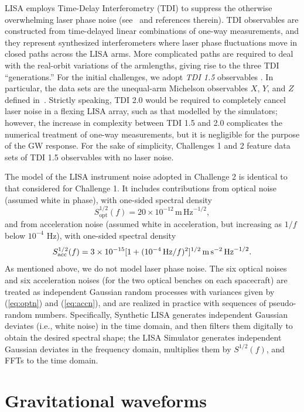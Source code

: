 \documentclass{iopart}
\def\be{\begin{equation}}
\def\ee{\end{equation}}
\begin{document}
LISA employs Time-Delay Interferometry (TDI) to suppress the otherwise overwhelming laser phase noise (see~\cite{firstgen,modified,secondgen} and references therein). TDI observables are constructed from time-delayed linear combinations of one-way measurements, and they represent synthesized interferometers where laser phase fluctuations move in closed paths across the LISA arms. More complicated paths are required to deal with the real-orbit variations of the armlengths, giving rise to the three TDI ``generations.'' For the initial challenges, we adopt \emph{TDI 1.5} observables \cite{modified,secondgen}. In particular, the data sets are the unequal-arm Michelson observables $X$, $Y$, and $Z$ defined in~\cite{secondgen}. Strictly speaking, TDI 2.0 would be required to completely cancel laser noise in a flexing LISA array, such as that modelled by the simulators; however, the increase in complexity between TDI 1.5 and 2.0 complicates the numerical treatment of one-way measurements, but it is negligible for the purpose of the GW response. For the sake of simplicity, Challenges 1 and 2 feature data sets of TDI 1.5 observables with no laser noise.

The model of the LISA instrument noise adopted in Challenge 2 is identical to that considered for Challenge 1. It includes contributions from optical noise (assumed white in phase), with one-sided spectral density
\be
S_\mathrm{opt}^{1/2}(f) = 20 \times 10^{-12} \, \mathrm{m}\, \mathrm{Hz}^{-1/2},
\label{eq:optn}
\ee
and from acceleration noise (assumed white in acceleration, but increasing as $1/f$ below $10^{-4}$ Hz), with one-sided spectral density 
\be
S_\mathrm{acc}^{1/2}(f) = 3 \times 10^{-15} [1 + (10^{-4}\,{\rm Hz}/f)^2]^{1/2}\, \mathrm{m}\, \mathrm{s}^{-2}\, \mathrm{Hz}^{-1/2}.
\label{eq:accn}
\ee
As mentioned above, we do not model laser phase noise. The six optical noises and six acceleration noises (for the two optical benches on each spacecraft) are treated as independent Gaussian random processes with variances given by (\ref{eq:optn}) and (\ref{eq:accn}), and are realized in practice with sequences of pseudo-random numbers. Specifically, Synthetic LISA generates independent Gaussian deviates (i.e., white noise) in the time domain, and then filters them digitally to obtain the desired spectral shape; the LISA Simulator generates independent Gaussian deviates in the frequency domain, multiplies them by $S^{1/2}(f)$, and FFTs to the time domain.

\section{Gravitational waveforms}
\end{document}
